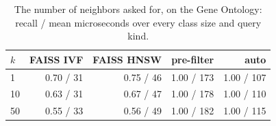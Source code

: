 \begin{table}[t]
\caption{The number of neighbors asked for, on the Gene Ontology: recall / mean microseconds over every class size and query kind.}
\label{tab-k}
\small
\begin{tabular}{@{}lrrrr@{}}
\toprule
$k$ & FAISS IVF & FAISS HNSW & pre-filter & auto \\
\midrule
1 & 0.70 / 31 & 0.75 / 46 & 1.00 / 173 & 1.00 / 107 \\
10 & 0.63 / 31 & 0.67 / 47 & 1.00 / 178 & 1.00 / 110 \\
50 & 0.55 / 33 & 0.56 / 49 & 1.00 / 182 & 1.00 / 115 \\
\bottomrule
\end{tabular}
\end{table}
